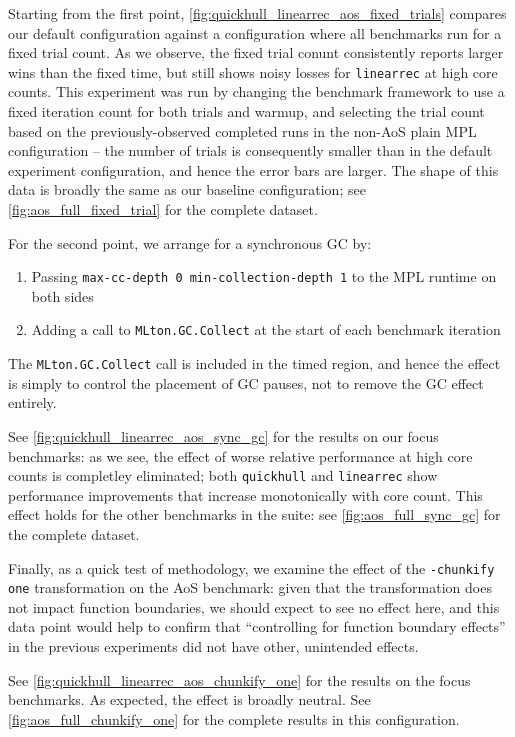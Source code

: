 Starting from the first point,
\cref{fig:quickhull_linearrec_aos_fixed_trials} compares our default
configuration against a configuration where all benchmarks run for a fixed trial
count. As we observe, the fixed trial conunt consistently reports larger wins
than the fixed time, but still shows noisy losses for \texttt{linearrec} at high
core counts. This experiment was run by changing the benchmark framework to use
a fixed iteration count for both trials and warmup, and selecting the trial
count based on the previously-observed completed runs in the non-AoS plain MPL
configuration -- the number of trials is consequently smaller than in the
default experiment configuration, and hence the error bars are larger. The shape
of this data is broadly the same as our baseline configuration; see
\cref{fig:aos_full_fixed_trial} for the complete dataset.

For the second point, we arrange for a synchronous GC by:
\begin{enumerate}
\item Passing \texttt{max-cc-depth 0 min-collection-depth 1} to the MPL runtime
  on both sides
\item Adding a call to \texttt{MLton.GC.Collect} at the start of each benchmark iteration
\end{enumerate}

The \texttt{MLton.GC.Collect} call is included in the timed region, and hence
the effect is simply to control the placement of GC pauses, not to remove the GC
effect entirely.

See \cref{fig:quickhull_linearrec_aos_sync_gc} for the results on our focus
benchmarks: as we see, the effect of worse relative performance at high core
counts is completley eliminated; both \texttt{quickhull} and \texttt{linearrec}
show performance improvements that increase monotonically with core count. This
effect holds for the other benchmarks in the suite: see
\cref{fig:aos_full_sync_gc} for the complete dataset.

Finally, as a quick test of methodology, we examine the effect of the
\texttt{-chunkify one} transformation on the AoS benchmark: given that the
transformation does not impact function boundaries, we should expect to see no
effect here, and this data point would help to confirm that ``controlling for
function boundary effects'' in the previous experiments did not have other,
unintended effects.

See \cref{fig:quickhull_linearrec_aos_chunkify_one} for the results on the focus
benchmarks. As expected, the effect is broadly neutral. See
\cref{fig:aos_full_chunkify_one} for the complete results in this configuration.


